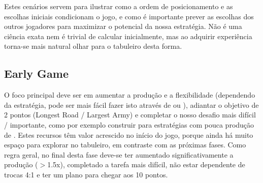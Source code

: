 \documentclass[12pt]{article}
\begin{document}
\noindent Estes cenários servem para ilustrar como a ordem de posicionamento e as escolhas iniciais condicionam o jogo, e como é importante prever as escolhas dos outros jogadores para maximizar o potencial da nossa estratégia.
Não é uma ciência exata nem é trivial de calcular inicialmente, mas ao adquirir experiência torna-se mais natural olhar para o tabuleiro desta forma.

\subsection{Early Game}
O foco principal deve ser em aumentar a produção e a flexibilidade (dependendo da estratégia, pode ser mais fácil fazer isto através de  ou ), adiantar o objetivo de 2 pontos (Longest Road / Largest Army) e completar o nosso desafio mais difícil / importante, como por exemplo construir  para estratégias com pouca produção de .
Estes recursos têm valor acrescido no início do jogo, porque ainda há muito espaço para explorar no tabuleiro, em contraste com as próximas fases.
Como regra geral, no final desta fase deve-se ter aumentado significativamente a produção ($>$1.5x), completado a tarefa mais difícil, não estar dependente de trocas 4:1 e ter um plano para chegar aos 10 pontos.
\end{document}

